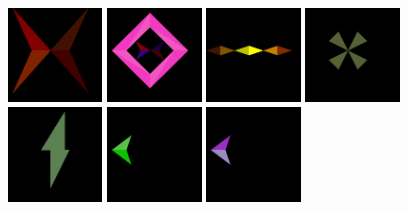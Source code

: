 \thispagestyle{empty} %
\clearpage
\vspace*{\fill}
\begin{figure}[H]
  \centering
\includegraphics[width=2.5cm]{preface/obj2d/obj_0.png}
\includegraphics[width=2.5cm]{preface/obj2d/obj_1.png}
\includegraphics[width=2.5cm]{preface/obj2d/obj_10.png}
\includegraphics[width=2.5cm]{preface/obj2d/obj_13.png}
\includegraphics[width=2.5cm]{preface/obj2d/obj_14.png}
\includegraphics[width=2.5cm]{preface/obj2d/obj_15.png}
\includegraphics[width=2.5cm]{preface/obj2d/obj_16.png}

\end{figure}
